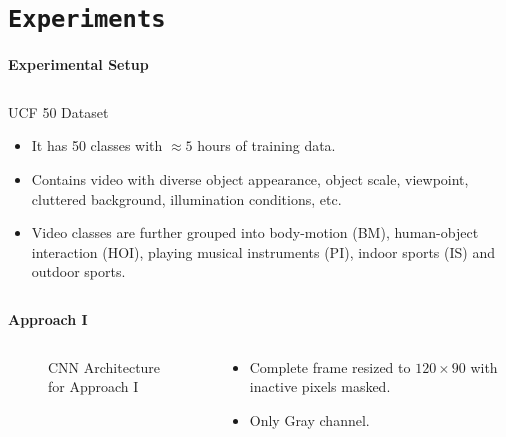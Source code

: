 \section{\texttt{Experiments}}
\begin{frame}{\textbf{Experimental Setup}}
\begin{columns}
	\begin{column}{0.9\textwidth}
		\begin{varblock}[\textwidth]{UCF 50 Dataset}
			\begin{itemize}
				\item It has 50 classes with $\approx 5$ hours of training data.
				\item Contains video with diverse object appearance, object scale, viewpoint, cluttered background, illumination conditions, etc.
				\item Video classes are further grouped into body-motion (BM), human-object interaction (HOI), playing musical instruments (PI), indoor sports (IS) and outdoor sports.
			\end{itemize}
		\end{varblock}
	\end{column}	
\end{columns}
\end{frame}
\begin{frame}{\textbf{Approach I}}
\begin{columns}
	\begin{column}{0.6\textwidth}
	\begin{figure}
		\centering
		\caption{CNN Architecture for Approach I}
	\end{figure}
	\end{column}
	\begin{column}{0.4\textwidth}
		\begin{itemize}
			\item Complete frame resized to $120 \times 90$ with inactive pixels masked.
			\item Only Gray channel.
		\end{itemize}
	\end{column}
\end{columns}
\end{frame}

